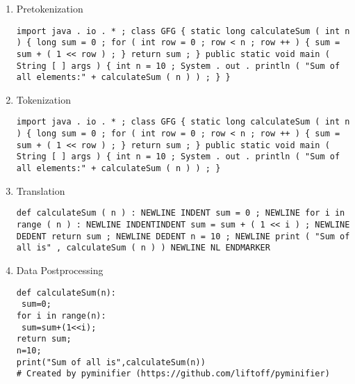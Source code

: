 \begin{enumerate}[topsep = 0pt, label = \roman*.]
\item Pretokenization \\
\vspace*{-\baselineskip}
\begin{Verbatim}[frame=single, breaklines=true, breakanywhere=true]
import java . io . * ; class GFG { static long calculateSum ( int n ) { long sum = 0 ; for ( int row = 0 ; row < n ; row ++ ) { sum = sum + ( 1 << row ) ; } return sum ; } public static void main ( String [ ] args ) { int n = 10 ; System . out . println ( "Sum of all elements:" + calculateSum ( n ) ) ; } }
\end{Verbatim}

\item Tokenization \\
\vspace*{-\baselineskip}
\begin{Verbatim}[frame=single, breaklines=true, breakanywhere=true]
import java . io . * ; class GFG { static long calculateSum ( int n ) { long sum = 0 ; for ( int row = 0 ; row < n ; row ++ ) { sum = sum + ( 1 << row ) ; } return sum ; } public static void main ( String [ ] args ) { int n = 10 ; System . out . println ( "Sum of all elements:" + calculateSum ( n ) ) ; } 
\end{Verbatim}

\item Translation \\
\vspace*{-\baselineskip}
\begin{Verbatim}[frame=single, breaklines=true, breakanywhere=true]
 def calculateSum ( n ) : NEWLINE INDENT sum = 0 ; NEWLINE for i in range ( n ) : NEWLINE INDENTINDENT sum = sum + ( 1 << i ) ; NEWLINE DEDENT return sum ; NEWLINE DEDENT n = 10 ; NEWLINE print ( "Sum of all is" , calculateSum ( n ) ) NEWLINE NL ENDMARKER 
\end{Verbatim}

\item Data Postprocessing \\
\vspace*{-\baselineskip}
\begin{Verbatim}[frame=single, breaklines=true, breakanywhere=true]
def calculateSum(n):
 sum=0;
for i in range(n):
 sum=sum+(1<<i);
return sum;
n=10;
print("Sum of all is",calculateSum(n))
# Created by pyminifier (https://github.com/liftoff/pyminifier)
\end{Verbatim}
\end{enumerate}


